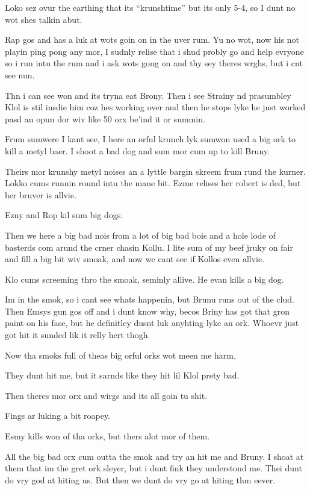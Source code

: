 Loko sez ovur the earthing that its ``krunshtime'' but its only 5-4, so I dunt no wot shes talkin abut.\medskip

Rap gos and has a luk at wots goin on in the uver rum. Yu no wot, now his not playin ping pong any mor, I sudnly relise that i shud probly go and help evryone so i run intu the rum and i ask wots gong on and thy sey theres wrghs, but i cnt see nun.\medskip

Thn i can see won and its tryna eat Brony. Then i see Strainy nd prasumbley Klol is stil insdie him coz hes working over and then he stops lyke he just worked pasd an opun dor wiv like 50 orx be'ind it or summin.\medskip

Frum sumwere I kant see, I here an orful krunch lyk sumwon used a big ork to kill a metyl baer. I shoot a bad dog and sum mor cum up to kill Bruny.\medskip

Theirs mor krunshy metyl noises an a lyttle bargin skreem frum rund the kurner. Lokko cums runnin round intu the mane bit. Ezme relises her robert is ded, but her bruver is allvie.\medskip

Ezny and Rop kil sum big dogs.\medskip

Then we here a big bad nois from a lot of big bad bois and a hole lode of basterds com arund the crner chasin Kollu. I lite sum of my beef jruky on fair and fill a big bit wiv smoak, and now we cant see if Kollos even allvie.\medskip

Klo cums screeming thro the smoak, seminly allive. He evan kills a big dog.\medskip

Im in the smok, so i cant see whats happenin, but Brunu runs out of the clud. Then Emsys gun gos off and i dunt know why, becos Briny has got that gron paint on his fase, but he definitley dusnt luk anyhting lyke an ork. Whoevr just got hit it sunded lik it relly hert thogh.\medskip

Now tha smoks full of theas big orful orks wot meen me harm.\medskip

They dunt hit me, but it sarnds like they hit lil Klol prety bad.\medskip

Then theres mor orx and wirgs and its all goin tu shit.\medskip

Fings ar luking a bit roapey.\medskip

Esmy kills won of tha orks, but thers alot mor of them.\medskip

All the big bad orx cum outta the smok and try an hit me and Bruny. I shoat at them that im the gret ork sleyer, but i dunt fink they understond me. Thei dunt do vry god at hiting us. But then we dunt do vry go at hiting thm eever.\medskip

